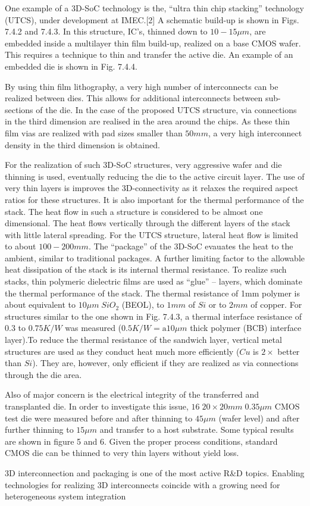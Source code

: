 One example of a 3D-SoC technology is the, ``ultra thin chip stacking''
technology (UTCS), under development at IMEC.[2] A
schematic build-up is shown in Figs. 7.4.2 and 7.4.3. In this structure,
IC's, thinned down to $10-15 \mu m$, are embedded inside a multilayer
thin film build-up, realized on a base CMOS wafer. This
requires a technique to thin and transfer the active die. An example
of an embedded die is shown in Fig. 7.4.4.

By using thin film lithography, a very high number of interconnects
can be realized between dies. This allows for additional
interconnects between sub-sections of the die. In the case of the
proposed UTCS structure, via connections in the third dimension
are realised in the area around the chips. As these thin film vias
are realized with pad sizes smaller than $50mm$, a very high
interconnect density in the third dimension is obtained.

For the realization of such 3D-SoC structures, very aggressive
wafer and die thinning is used, eventually reducing the die to the
active circuit layer. The use of very thin layers is improves the 3D-connectivity
as it relaxes the required aspect ratios for these structures.
It is also important for the thermal performance of the stack.
The heat flow in such a structure is considered to be almost one dimensional.
The heat flows vertically through the different layers
of the stack with little lateral spreading. For the UTCS structure,
lateral heat flow is limited to about $100-200mm$. The ``package'' of
the 3D-SoC evauates the heat to the ambient, similar to traditional
packages. A further limiting factor to the allowable heat dissipation
of the stack is its internal thermal resistance. To realize such
stacks, thin polymeric dielectric films are used as ``glue'' – layers,
which dominate the thermal performance of the stack. The thermal
resistance of 1mm polymer is about equivalent to $10\mu m \; SiO_2$
(BEOL), to $1mm$ of $Si$ or to $2mm$ of copper. For structures similar
to the one shown in Fig. 7.4.3, a thermal interface resistance of $0.3$
to $0.75 K/W$ was measured ($0.5 K/W = \textrm{a} 10\mu m$ thick polymer (BCB)
interface layer).To reduce the thermal resistance of the sandwich
layer, vertical metal structures are used as they conduct heat much
more efficiently ($Cu$ is $2\times$ better than $Si$). They are, however, only
efficient if they are realized as via connections through the die area.

Also of major concern is the electrical integrity of the transferred
and transplanted die. In order to investigate this issue, $16 \; 20\times20
mm\;0.35 \mu m$ CMOS test die were measured before and after thinning
to $45 \mu m$ (wafer level) and after further thinning to $15 \mu m$ and
transfer to a host substrate. Some typical results are shown in figure
5 and 6. Given the proper process conditions, standard CMOS
die can be thinned to very thin layers without yield loss.

3D interconnection and packaging is one of the most active R\&D
topics. Enabling technologies for realizing 3D interconnects
coincide with a growing need for heterogeneous system integration